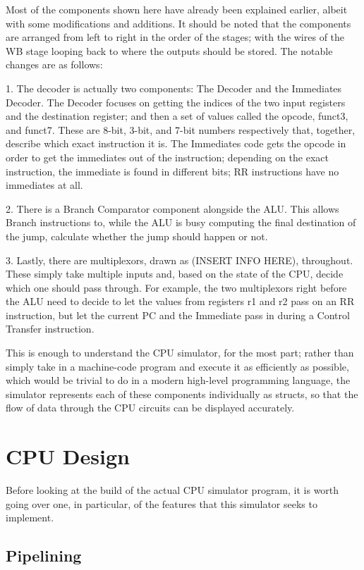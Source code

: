 \documentclass[12pt,twoside]{reedthesis}
\begin{document}
Most of the components shown here have already been explained earlier, albeit with some modifications and additions. It should be noted that the components are arranged from left to right in the order of the stages; with the wires of the WB stage looping back to where the outputs should be stored. The notable changes are as follows:

1. The decoder is actually two components: The Decoder and the Immediates Decoder. The Decoder focuses on getting the indices of the two input registers and the destination register; and then a set of values called the opcode, funct3, and funct7. These are 8-bit, 3-bit, and 7-bit numbers respectively that, together, describe which exact instruction it is. The Immediates code gets the opcode in order to get the immediates out of the instruction; depending on the exact instruction, the immediate is found in different bits; RR instructions have no immediates at all.

2. There is a Branch Comparator component alongside the ALU. This allows Branch instructions to, while the ALU is busy computing the final destination of the jump, calculate whether the jump should happen or not.

3. Lastly, there are multiplexors, drawn as (INSERT INFO HERE), throughout. These simply take multiple inputs and, based on the state of the CPU, decide which one should pass through. For example, the two multiplexors right before the ALU need to decide to let the values from registers r1 and r2 pass on an RR instruction, but let the current PC and the Immediate pass in during a Control Transfer instruction.

This is enough to understand the CPU simulator, for the most part; rather than simply take in a machine-code program and execute it as efficiently as possible, which would be trivial to do in a modern high-level programming language, the simulator represents each of these components individually as structs, so that the flow of data through the CPU circuits can be displayed accurately.

\chapter{CPU Design}

Before looking at the build of the actual CPU simulator program, it is worth going over one, in particular, of the features that this simulator seeks to implement.

\section{Pipelining}
\end{document}
